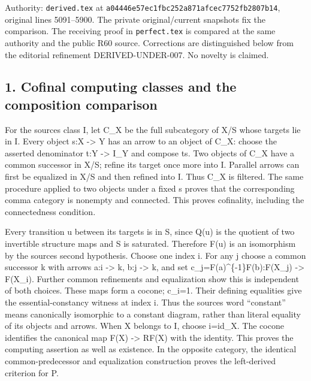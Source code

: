 \documentclass[11pt]{article}
\begin{document}
Authority:\allowbreak{} \texttt{derived.\allowbreak{}tex} at \texttt{a04446e5\allowbreak{}7ec1fbc2\allowbreak{}52a871af\allowbreak{}cec7752f\allowbreak{}b2807b14},\allowbreak{} original lines 5091–\allowbreak{}5900. The private original/\allowbreak{}current snapshots fix the comparison. The receiving proof in \texttt{perfect.\allowbreak{}tex} is compared at the same authority and the public R60 source. Corrections are distinguished below from the editorial refinement DERIVED-UNDER-007. No novelty is claimed.

\subsection{1. Cofinal computing classes and the composition comparison}\label{proofs-5091-5900-cofinal-computing-classes-and-the-composition-comparison}

For the source\textquotesingle s class I,\allowbreak{} let C\_\allowbreak{}X be the full subcategory of X/\allowbreak{}S whose targets lie in I. Every object s:\allowbreak{}X \allowbreak{}-> Y has an arrow to an object of C\_\allowbreak{}X:\allowbreak{} choose the asserted denominator t:\allowbreak{}Y \allowbreak{}-> I\_\allowbreak{}Y and compose ts. Two objects of C\_\allowbreak{}X have a common successor in X/\allowbreak{}S; refine its target once more into I. Parallel arrows can first be equalized in X/\allowbreak{}S and then refined into I. Thus C\_\allowbreak{}X is filtered. The same procedure applied to two objects under a fixed s proves that the corresponding comma category is nonempty and connected. This proves cofinality,\allowbreak{} including the connectedness condition.

Every transition u between its targets is in S,\allowbreak{} since Q(u)\allowbreak{} is the quotient of two invertible structure maps and S is saturated. Therefore F(u)\allowbreak{} is an isomorphism by the source\textquotesingle s second hypothesis. Choose one index i. For any j choose a common successor k with arrows a:\allowbreak{}i \allowbreak{}-> k,\allowbreak{} b:\allowbreak{}j \allowbreak{}-> k,\allowbreak{} and set c\_\allowbreak{}j\allowbreak{}=F(a)\allowbreak{}\textasciicircum{}\{-1\}F(b)\allowbreak{}:\allowbreak{}F(X\_\allowbreak{}j)\allowbreak{} \allowbreak{}-> F(X\_\allowbreak{}i)\allowbreak{}. Further common refinements and equalization show this is independent of both choices. These maps form a cocone; c\_\allowbreak{}i\allowbreak{}=1. Their defining equalities give the essential-constancy witness at index i. Thus the source\textquotesingle s word ``constant'' means canonically isomorphic to a constant diagram,\allowbreak{} rather than literal equality of its objects and arrows. When X belongs to I,\allowbreak{} choose i\allowbreak{}=id\_\allowbreak{}X. The cocone identifies the canonical map F(X)\allowbreak{} \allowbreak{}-> RF(X)\allowbreak{} with the identity. This proves the computing assertion as well as existence. In the opposite category,\allowbreak{} the identical common-predecessor and equalization construction proves the left-derived criterion for P.
\end{document}
